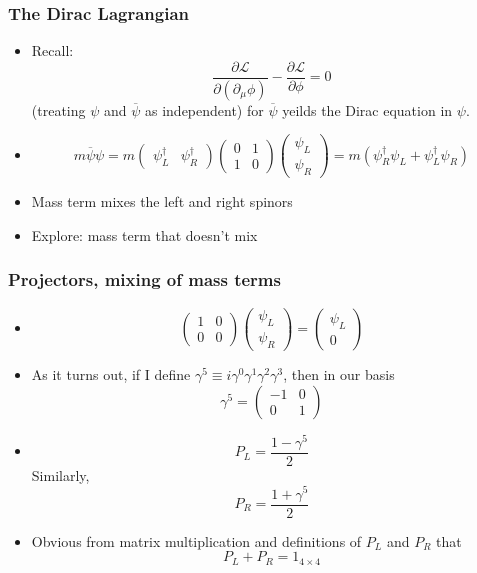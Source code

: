 \documentclass{beamer}
\begin{document}
\begin{frame}
	\frametitle{The Dirac Lagrangian}
	\begin{itemize}

		\item Recall:
\[
\frac{\partial\mathcal{L}}{\partial(\partial_{\mu}\phi)}-\frac{\partial\mathcal{L}}{\partial\phi}=0
\]
		\pause 
		(treating $\psi$ and $\overline{\psi}$ as independent) for $\overline{\psi}$ yeilds the Dirac equation in $\psi$.

		\item 
\[
m\overline{\psi}\psi=m\left(\begin{array}{cc}
\psi_{L}^{\dagger} & \psi_{R}^{\dagger}\end{array}\right)\left(\begin{array}{cc}
0 & 1\\
1 & 0
\end{array}\right)\left(\begin{array}{c}
\psi_{L}\\
\psi_{R}
\end{array}\right)=m(\psi_{R}^{\dagger}\psi_{L}+\psi_{L}^{\dagger}\psi_{R})
\]
\pause
		\item Mass term mixes the left and right spinors
		\item Explore: mass term that doesn't mix
	\end{itemize}
\end{frame}



\begin{frame}
	\frametitle{Projectors, mixing of mass terms}
	\begin{itemize}
		\item 
		\pause
\[
\left(\begin{array}{cc}
1 & 0\\
0 & 0
\end{array}\right)\left(\begin{array}{c}
\psi_{L}\\
\psi_{R}
\end{array}\right)=\left(\begin{array}{c}
\psi_{L}\\
0
\end{array}\right)
\]
		\item As it turns out, if I define $\gamma^{5}\equiv i\gamma^{0}\gamma^{1}\gamma^{2}\gamma^{3}$, \pause
then in our basis 
\[\gamma^{5}=\left(\begin{array}{cc}
-1 & 0\\
0 & 1
\end{array}\right)\]
\pause
		\item 
		\pause
\[
P_{L}=\frac{1-\gamma^{5}}{2}
\]
Similarly,
\[
P_{R}=\frac{1+\gamma^{5}}{2}
\]

		\item Obvious from matrix multiplication and definitions of
		\pause
$P_{L}$ and $P_{R}$ that 
\pause
\[
P_{L}+P_{R}=1_{4\times4}
\]

	\end{itemize}
\end{frame}
\end{document}

